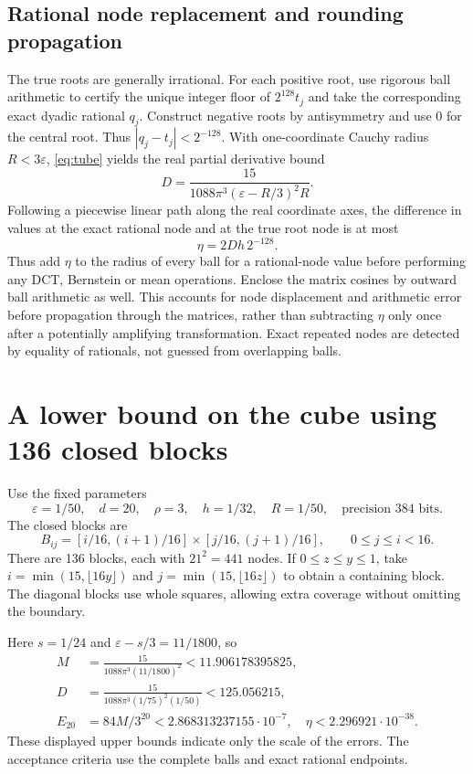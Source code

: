\documentclass[11pt,a4paper]{article}
\theoremstyle{definition}\newtheorem{definition}[theorem]{Definition}
\theoremstyle{remark}\newtheorem{remark}[theorem]{Remark}
\newcommand{\abs}[1]{\left|#1\right|}
\begin{document}
\subsection{Rational node replacement and rounding propagation}
The true roots are generally irrational. For each positive root, use rigorous ball arithmetic to certify the unique integer floor of $2^{128}t_j$ and take the corresponding exact dyadic rational $q_j$. Construct negative roots by antisymmetry and use $0$ for the central root. Thus $\abs{q_j-t_j}<2^{-128}$. With one-coordinate Cauchy radius $R<3\varepsilon$, \eqref{eq:tube} yields the real partial derivative bound
\begin{equation}\label{eq:derivative}
 D=\frac{15}{1088\pi^3(\varepsilon-R/3)^2R}.
\end{equation}
Following a piecewise linear path along the real coordinate axes, the difference in values at the exact rational node and at the true root node is at most
\begin{equation}\label{eq:displacement}
 \eta=2Dh\,2^{-128}.
\end{equation}
Thus add $\eta$ to the radius of every ball for a rational-node value before performing any DCT, Bernstein or mean operations. Enclose the matrix cosines by outward ball arithmetic as well. This accounts for node displacement and arithmetic error before propagation through the matrices, rather than subtracting $\eta$ only once after a potentially amplifying transformation. Exact repeated nodes are detected by equality of rationals, not guessed from overlapping balls.

\section{A lower bound on the cube using 136 closed blocks}
Use the fixed parameters
\begin{equation}\label{eq:gparams}
 \varepsilon=1/50,\quad d=20,\quad \rho=3,\quad h=1/32,
 \quad R=1/50,\quad\text{precision }384\text{ bits}.
\end{equation}
The closed blocks are
\[
 B_{ij}=[i/16,(i+1)/16]\times[j/16,(j+1)/16],
 \qquad0\le j\le i<16.
\]
There are 136 blocks, each with $21^2=441$ nodes. If $0\le z\le y\le1$, take
$i=\min(15,\lfloor16y\rfloor)$ and $j=\min(15,\lfloor16z\rfloor)$ to obtain a containing block. The diagonal blocks use whole squares, allowing extra coverage without omitting the boundary.

Here $s=1/24$ and $\varepsilon-s/3=11/1800$, so
\begin{align*}
 M&=\frac{15}{1088\pi^3(11/1800)^2}<11.906178395825,\\
 D&=\frac{15}{1088\pi^3(1/75)^2(1/50)}<125.056215,\\
 E_{20}&=84M/3^{20}<2.868313237155\cdot10^{-7},\quad
 \eta<2.296921\cdot10^{-38}.
\end{align*}
These displayed upper bounds indicate only the scale of the errors. The acceptance criteria use the complete balls and exact rational endpoints.
\end{document}
